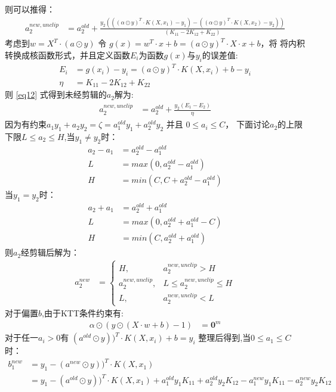 \documentclass[12pt, a4paper, oneside]{ctexart}
\begin{document}
则可以推得：
\begin{align}      
    a_2^{new,unclip} &= a_2^{old} + \frac{y_2(((\alpha \odot y)^T \cdot K(X, x_1) - y_1) - ((\alpha \odot y)^T \cdot K(X, x_2)-y_2))}{(K_{11} - 2K_{12} + K_{22})} \label{eq12} 
\end{align}
考虑到$ w = X^T \cdot (a \odot y) $ 令 $ g(x) = w^T \cdot x + b = (a \odot y)^T \cdot X \cdot x + b$，将
将内积转换成核函数形式，并且定义函数$E_i$为函数$g(x)$与$y_i$的误差值:
\begin{align*}
    E_i &= g(x_i) - y_i  = (a \odot y)^T \cdot K(X, x_i) + b - y_i\\
    \eta &= K_{11} - 2K_{12} + K_{22}
\end{align*}
则 \eqref{eq12} 式得到未经剪辑的$a_2$解为:
\begin{align}      
    a_2^{new,unclip} &= a_2^{old} + \frac{y_2(E_1 - E_2)}{\eta} \label{eq13} 
\end{align}
因为有约束$a_1y_1 + a_2y_2 = \zeta = a_1^{old}y_1 + a_2^{old}y_2$ 并且 $0 \leq a_i \leq C$，
下面讨论$a_2$的上限下限$L \leq a_2 \leq H$,当$y_1 \neq y_2$时：
\begin{align*}
    a_2 - a_1 &= a_2^{old} - a_1^{old} \\
    L &= max(0, a_2^{old} - a_1^{old}) \\
    H &= min(C, C + a_2^{old} - a_1^{old})
\end{align*}
当$y_1 = y_2$时：
\begin{align*}
    a_2 + a_1 &= a_2^{old} + a_1^{old} \\
    L &= max(0, a_2^{old} + a_1^{old} - C) \\
    H &= min(C, a_2^{old} + a_1^{old})
\end{align*}
则$a_2$经剪辑后解为：
\begin{align*}
    a_2^{new} &= 
\left\{
    \begin{array}{lr}
    H, & a_2^{new,unclip} > H  \\
    a_2^{new,unclip}, & L \leq a_2^{new,unclip} \leq H\\
    L, & a_2^{new,unclip} < L  
    \end{array}
\right.
\end{align*}
对于偏置$b$,由于KTT条件约束有:
\begin{align*}
    {\alpha} \odot  (y \odot (X \cdot w + b) - 1) &= \boldsymbol{0}^m 
\end{align*}
对于任一$a_i > 0$有  $(a^{old} \odot y))^T \cdot K(X, x_i) + b = y_i $ 整理后得到,当$0 \leq a_1 \leq C$时：
\begin{align*}
    b_1^{new} &= y_1 - (a^{new} \odot y))^T \cdot K(X, x_1) \\
    &= y_1 - (a^{old} \odot y))^T \cdot K(X, x_1) + a_1^{old}y_1K_{11} + a_2^{old}y_2K_{12} - a_1^{new}y_1K_{11} - a_2^{new}y_2K_{12} 
\end{align*}
\end{document}
